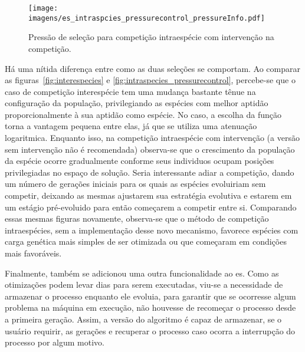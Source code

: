 \begin{figure}[h!t]
\centering
\texttt{[image: imagens/es\_intraspcies\_pressurecontrol\_pressureInfo.pdf]}
\caption[Pressão de seleção para competição intraespécie com 
intervenção na competição.]{Pressão de seleção para competição
intraespécie com intervenção na competição.}
\label{fig:intraspecies_pressurecontrol_info}
\end{figure}

Há uma nítida diferença entre como as duas seleções se comportam. Ao
comparar as figuras~\ref{fig:interespecies} e
\ref{fig:intraspecies_pressurecontrol}, percebe-se que o caso de
competição interespécie tem uma mudança bastante tênue na configuração
da população, privilegiando as espécies com melhor aptidão
proporcionalmente à sua aptidão como espécie. No caso, a escolha da
função torna a vantagem pequena entre elas, já que se utiliza uma
atenuação logaritmica. Enquanto isso, na competição intraespécie com
intervenção (a versão sem intervenção não é recomendada) observa-se
que o crescimento da população da espécie ocorre gradualmente conforme
seus individuos ocupam posições privilegiadas no espaço de
solução. Seria interessante adiar a competição, dando um número de
gerações iniciais para os quais as espécies evoluiriam sem competir,
deixando as mesmas ajustarem sua estratégia evolutiva e estarem
em um estágio pré-evoluido para então começarem a competir entre si.
Comparando essas mesmas figuras novamente, observa-se que o método
de competição intraespécies, sem a implementação desse novo mecanismo,
favorece espécies com carga genética mais simples de ser otimizada ou
que começaram em condições mais favoráveis.

Finalmente, também se adicionou uma outra funcionalidade ao \acs{es}.
Como as otimizações podem levar dias para serem executadas, viu-se a
necessidade de armazenar o processo enquanto ele evoluia, para
garantir que se ocorresse algum problema na máquina em execução, não
houvesse de recomeçar o processo desde a primeira geração. Assim, a
versão do algoritmo é capaz de armazenar, se o usuário requirir, as
gerações e recuperar o processo caso ocorra a interrupção do processo
por algum motivo. 

